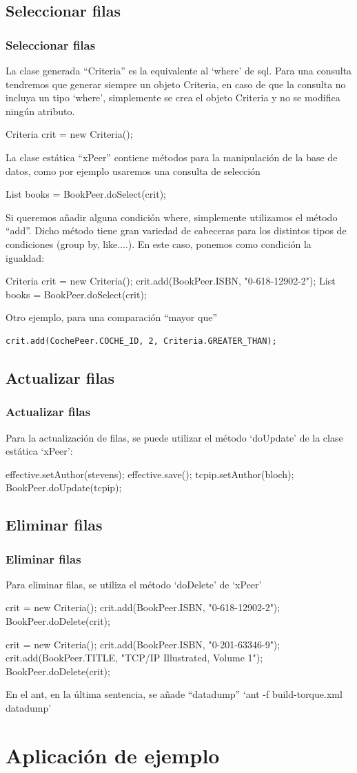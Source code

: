 \documentclass[24pt, a4paper, oneside, spanish]{beamer}
\begin{document}
	\subsection{Seleccionar filas}
	\begin{frame}
	\frametitle{Seleccionar filas}
	La clase generada “Criteria” es la equivalente al ‘where’ de sql. Para una consulta tendremos que generar siempre un objeto Criteria, en caso de que la consulta no incluya un tipo ‘where’, simplemente se crea el objeto Criteria y no se modifica ningún atributo.

Criteria crit = new Criteria();

La clase estática “xPeer” contiene métodos para la manipulación de la base de datos, como por ejemplo usaremos una consulta de selección

List books = BookPeer.doSelect(crit);

Si queremos añadir alguna condición where, simplemente utilizamos el método “add”. Dicho método tiene gran variedad de cabeceras para los distintos tipos de condiciones (group by, like....). En este caso, ponemos como condición la igualdad:

Criteria crit = new Criteria();
crit.add(BookPeer.ISBN, "0-618-12902-2");
List books = BookPeer.doSelect(crit);

Otro ejemplo, para una comparación “mayor que”

\begin{lstlisting}
crit.add(CochePeer.COCHE_ID, 2, Criteria.GREATER_THAN);
\end{lstlisting}
	\end{frame}
	
	\subsection{Actualizar filas}
	\begin{frame}
	\frametitle{Actualizar filas}
	Para la actualización de filas, se puede utilizar el método ‘doUpdate’ de la clase estática ‘xPeer’:

effective.setAuthor(stevens);
effective.save();
tcpip.setAuthor(bloch);
BookPeer.doUpdate(tcpip);
	\end{frame}
	
	\subsection{Eliminar filas}
	\begin{frame}
	\frametitle{Eliminar filas}
	\setbeamercovered{invisible}
	
Para eliminar filas, se utiliza el método ‘doDelete’ de ‘xPeer’

crit = new Criteria();
crit.add(BookPeer.ISBN, "0-618-12902-2");
BookPeer.doDelete(crit);

crit = new Criteria();
crit.add(BookPeer.ISBN, "0-201-63346-9");
crit.add(BookPeer.TITLE, "TCP/IP Illustrated, Volume 1");
BookPeer.doDelete(crit);

En el ant, en la última sentencia, se añade “datadump” 
‘ant -f build-torque.xml datadump’	
	\end{frame}
	
\section{Aplicación de ejemplo}
\end{document}
